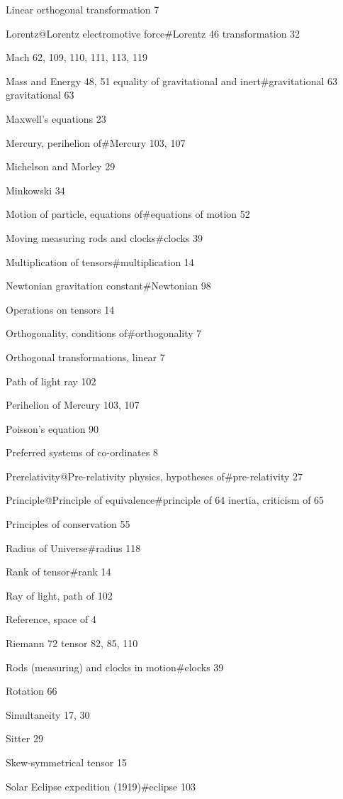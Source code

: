 \documentclass[12pt]{book}[2005/09/16]
\begin{document}
Linear orthogonal transformation 7

Lorentz@{Lorentz electromotive force}#Lorentz 46
  transformation 32

Mach 62, 109, 110, 111, 113, 119

Mass and Energy 48, 51
  equality of gravitational and inert#gravitational 63
  gravitational 63

Maxwell's equations 23

Mercury, perihelion of#Mercury 103, 107

Michelson and Morley 29

Minkowski 34

Motion of particle, equations of#equations of motion 52

Moving measuring rods and clocks#clocks 39

Multiplication of tensors#multiplication 14

Newtonian gravitation constant#Newtonian 98

Operations on tensors 14 %

Orthogonality, conditions of#orthogonality 7

Orthogonal transformations, linear 7

Path of light ray 102

Perihelion of Mercury 103, 107

Poisson's equation 90

Preferred systems of co-ordinates 8

Prerelativity@{Pre-relativity physics, hypotheses of}#pre-relativity 27

Principle@{Principle of equivalence}#principle of 64
  inertia, criticism of 65

Principles of conservation 55

Radius of Universe#radius 118

Rank of tensor#rank 14

Ray of light, path of 102

Reference, space of 4

Riemann 72
  tensor 82, 85, 110

Rods (measuring) and clocks in motion#clocks 39

Rotation 66

Simultaneity 17, 30

Sitter 29

Skew-symmetrical tensor 15

Solar Eclipse expedition (1919)#eclipse 103
\end{document}
